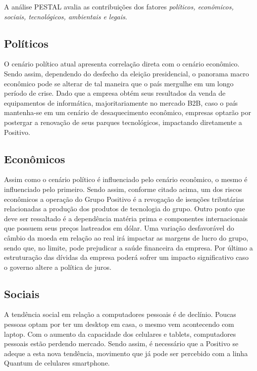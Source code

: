 {{{A análise PESTAL avalia as contribuições dos fatores \emph{políticos, econômicos, sociais, tecnológicos, ambientais e legais}.

\subsection{Políticos}
O cenário político atual apresenta correlação direta com o cenário econômico. Sendo assim, dependendo do desfecho da eleição presidencial, o panorama macro econômico pode se alterar de tal maneira que o país mergulhe em um longo período de crise. Dado que a empresa obtém seus resultados da venda de equipamentos de informática, majoritariamente no mercado B2B, caso o país mantenha-se em um cenário de desaquecimento econômico, empresas optarão por postergar a renovação de seus parques tecnológicos, impactando diretamente a Positivo.

\subsection{Econômicos}

Assim como o cenário político é influenciado pelo cenário econômico, o mesmo é influenciado pelo primeiro. Sendo assim, conforme citado acima, um dos riscos econômicos a operação do Grupo Positivo é a revogação de isenções tributárias relacionadas a produção dos produtos de tecnologia do grupo. Outro ponto que deve ser ressaltado é a dependência matéria prima e componentes internacionais que possuem seus preços lastreados em dólar. Uma variação desfavorável do câmbio da moeda em relação ao real irá impactar as margens de lucro do grupo, sendo que, no limite, pode prejudicar a saúde financeira da empresa.
Por último a estruturação das dívidas da empresa poderá sofrer um impacto significativo caso o governo altere a política de juros.

\subsection{Sociais}
A tendência social em relação a computadores pessoais é de declínio. Poucas pessoas optam por ter um desktop em casa, o mesmo vem acontecendo com laptop. Com o aumento da capacidade dos celulares e tablets, computadores pessoais estão perdendo mercado. Sendo assim, é necessário que a Positivo se adeque a esta nova tendência, movimento que já pode ser percebido com a linha Quantum de celulares smartphone.

}}}

